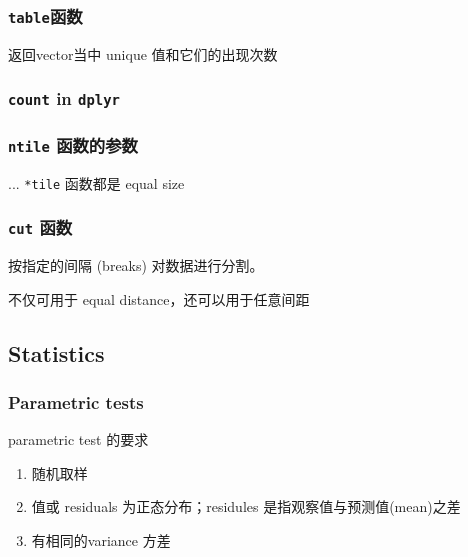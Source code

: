 \documentclass[
]{article}
\begin{document}
\hypertarget{tableux51fdux6570}{%
\subsubsection{\texorpdfstring{\texttt{table}函数}{table函数}}\label{tableux51fdux6570}}

返回vector当中 unique 值和它们的出现次数

\hypertarget{count-in-dplyr}{%
\subsubsection{\texorpdfstring{\texttt{count} in \texttt{dplyr}
}{count in dplyr }}\label{count-in-dplyr}}

\hypertarget{ntile-ux51fdux6570ux7684ux53c2ux6570}{%
\subsubsection{\texorpdfstring{\texttt{ntile}
函数的参数}{ntile 函数的参数}}\label{ntile-ux51fdux6570ux7684ux53c2ux6570}}

... \texttt{*tile} 函数都是 equal size

\hypertarget{cut-ux51fdux6570}{%
\subsubsection{\texorpdfstring{\texttt{cut}
函数}{cut 函数}}\label{cut-ux51fdux6570}}

按指定的间隔 (breaks) 对数据进行分割。

不仅可用于 equal distance，还可以用于任意间距

\hypertarget{statistics}{%
\subsection{Statistics}\label{statistics}}

\hypertarget{parametric-tests}{%
\subsubsection{Parametric tests}\label{parametric-tests}}

parametric test 的要求

\begin{enumerate}
\def\labelenumi{\arabic{enumi}.}
\item
  随机取样
\item
  值或 residuals 为正态分布；residules 是指观察值与预测值(mean)之差
\item
  有相同的variance 方差
\end{enumerate}
\end{document}

